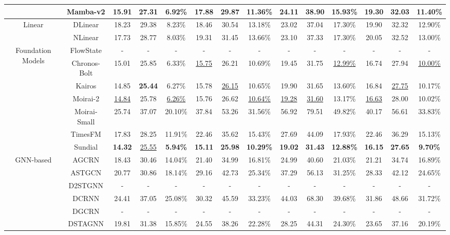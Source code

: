 \begin{table}[t]
{\begin{tabular}{c|c|c|c|c|c|c|c|c|c|c|c|c|c}
 & Mamba-v2 & 15.91 & 27.31 & 6.92\% & 17.88 & 29.87 & 11.36\% & 24.11 & 38.90 & 15.93\% & 19.30 & 32.03 & 11.40\% \\
\midrule
\multirow{2}{*}{Linear} & DLinear & 18.23 & 29.38 & 8.23\% & 18.46 & 30.54 & 13.18\% & 23.02 & 37.04 & 17.30\% & 19.90 & 32.32 & 12.90\% \\
 & NLinear & 17.73 & 28.77 & 8.03\% & 19.31 & 31.45 & 13.66\% & 23.10 & 37.33 & 17.30\% & 20.05 & 32.52 & 13.00\% \\
\midrule
\multirow{7}{*}{Foundation Models} & FlowState & - & - & - & - & - & - & - & - & - & - & - & - \\
 & Chronos-Bolt & 15.01 & 25.85 & 6.33\% & \underline{15.75} & 26.21 & 10.69\% & 19.45 & 31.75 & \underline{12.99\%} & 16.74 & 27.94 & \underline{10.00\%} \\
 & Kairos & 14.85 & \textbf{25.44} & 6.27\% & 15.78 & \underline{26.15} & 10.65\% & 19.90 & 31.65 & 13.60\% & 16.84 & \underline{27.75} & 10.17\% \\
 & Moirai-2 & \underline{14.84} & 25.78 & \underline{6.26\%} & 15.76 & 26.62 & \underline{10.64\%} & \underline{19.28} & \underline{31.60} & 13.17\% & \underline{16.63} & 28.00 & 10.02\% \\
 & Moirai-Small & 25.74 & 37.07 & 20.10\% & 37.84 & 53.26 & 31.56\% & 56.92 & 79.51 & 49.82\% & 40.17 & 56.61 & 33.83\% \\
 & TimesFM & 17.83 & 28.25 & 11.91\% & 22.46 & 35.62 & 15.43\% & 27.69 & 44.09 & 17.93\% & 22.46 & 36.29 & 15.13\% \\
 & Sundial & \textbf{14.32} & \underline{25.55} & \textbf{5.94\%} & \textbf{15.11} & \textbf{25.98} & \textbf{10.29\%} & \textbf{19.02} & \textbf{31.43} & \textbf{12.88\%} & \textbf{16.15} & \textbf{27.65} & \textbf{9.70\%} \\
\midrule
\multirow{10}{*}{GNN-based} & AGCRN & 18.43 & 30.46 & 14.04\% & 21.40 & 34.99 & 16.81\% & 24.99 & 40.60 & 21.03\% & 21.21 & 34.74 & 16.89\% \\
 & ASTGCN & 20.77 & 30.86 & 18.14\% & 29.16 & 42.73 & 25.34\% & 37.29 & 56.13 & 31.25\% & 28.33 & 42.12 & 24.65\% \\
 & D2STGNN & - & - & - & - & - & - & - & - & - & - & - & - \\
 & DCRNN & 24.41 & 37.05 & 25.08\% & 30.32 & 45.59 & 33.23\% & 44.03 & 68.30 & 39.68\% & 31.86 & 48.66 & 31.72\% \\
 & DGCRN & - & - & - & - & - & - & - & - & - & - & - & - \\
 & DSTAGNN & 19.81 & 31.38 & 15.85\% & 24.55 & 38.26 & 22.28\% & 28.25 & 44.31 & 24.30\% & 23.65 & 37.16 & 20.19\% \\

\end{tabular}}
\end{table}
